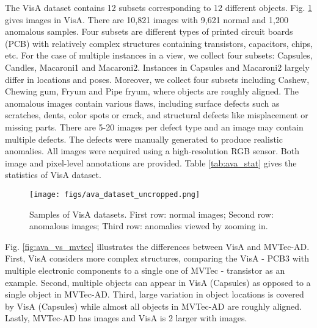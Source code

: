\documentclass[runningheads]{llncs}
\begin{document}
The VisA dataset contains 12 subsets corresponding to 12 different objects. Fig. \ref{fig:ava_samples} gives images in VisA. There are 10,821 images with 9,621 normal and 1,200 anomalous samples. Four subsets are different types of printed circuit boards (PCB) with relatively complex structures containing transistors, capacitors, chips, etc. For the case of multiple instances in a view, we collect four subsets: Capsules, Candles, Macaroni1 and Macaroni2. Instances in Capsules and Macaroni2 largely differ in locations and poses. Moreover, we collect four subsets including Cashew, Chewing gum, Fryum and Pipe fryum, where objects are roughly aligned. The anomalous images contain various flaws, including surface defects such as scratches, dents, color spots or crack, and structural defects like misplacement or missing parts. There are 5-20 images per defect type and an image may contain multiple defects. The defects were manually generated to produce realistic anomalies. All images were acquired using a  high-resolution RGB sensor. Both image and pixel-level annotations are provided. Table \ref{tab:ava_stat} gives the statistics of VisA dataset. 
\begin{figure}[!t]
 \centering
\texttt{[image: figs/ava\_dataset\_uncropped.png]}
\caption{Samples of VisA datasets. First row: normal images; Second row: anomalous images; Third row: anomalies viewed by zooming in.}
\label{fig:ava_samples}
\end{figure}

Fig. \ref{fig:ava_vs_mvtec} illustrates the differences between VisA and MVTec-AD. First, VisA considers more complex structures, comparing the VisA - PCB3 with multiple electronic components to a single one of MVTec - transistor as an example. Second, multiple objects can appear in VisA (Capsules) as opposed to a single object in MVTec-AD. Third, large variation in object locations is covered by VisA (Capsules) while almost all objects in MVTec-AD are roughly aligned. Lastly, MVTec-AD has  images and VisA is 2 larger with  images.
\end{document}
